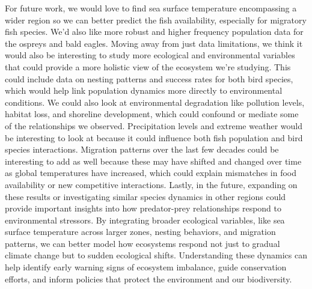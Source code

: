 \documentclass{article}
\begin{document}
For future work, we would love to find sea surface temperature encompassing a wider region so we can better predict the fish availability, especially for migratory fish species. We’d also like more robust and higher frequency population data for the ospreys and bald eagles. Moving away from just data limitations, we think it would also be interesting to study more ecological and environmental variables that could provide a more holistic view of the ecosystem we’re studying. This could include data on nesting patterns and success rates for both bird species, which would help link population dynamics more directly to environmental conditions. We could also look at environmental degradation like pollution levels, habitat loss, and shoreline development, which could confound or mediate some of the relationships we observed. Precipitation levels and extreme weather would be interesting to look at because it could influence both fish population and bird species interactions. Migration patterns over the last few decades could be interesting to add as well because these may have shifted and changed over time as global temperatures have increased, which could explain mismatches in food availability or new competitive interactions. Lastly, in the future, expanding on these results or investigating similar species dynamics in other regions could provide important insights into how predator-prey relationships respond to environmental stressors. By integrating broader ecological variables, like sea surface temperature across larger zones, nesting behaviors, and migration patterns, we can better model how ecosystems respond not just to gradual climate change but to sudden ecological shifts. Understanding these dynamics can help identify early warning signs of ecosystem imbalance, guide conservation efforts, and inform policies that protect the environment and our biodiversity. 
\end{document}

